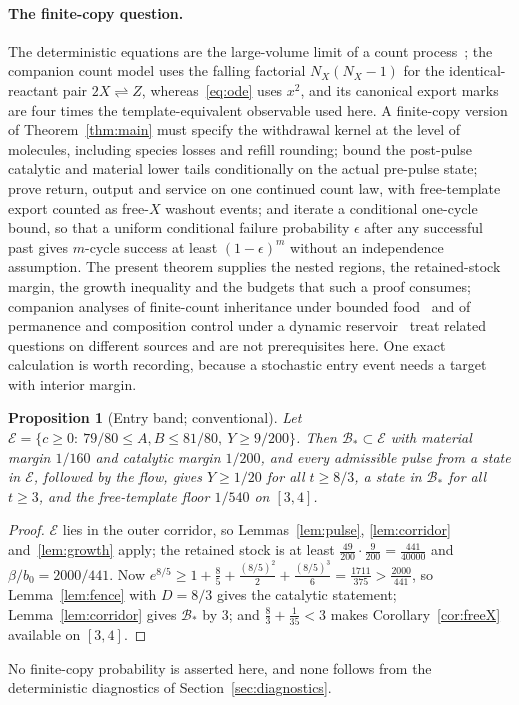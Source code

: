 \documentclass[11pt,a4paper]{article}
\theoremstyle{plain}
\newtheorem{proposition}[theorem]{Proposition}
\theoremstyle{definition}
\theoremstyle{remark}
\newcommand{\Bstar}{\mathcal B_*}
\newcommand{\Ent}{\mathcal E}
\begin{document}
\paragraph{The finite-copy question.}
The deterministic equations are the large-volume limit of a count process~\citep{kurtz1972,anderson2015}; the companion count model uses the falling factorial $N_X(N_X-1)$ for the identical-reactant pair $2X\rightleftharpoons Z$, whereas~\eqref{eq:ode} uses $x^2$, and its canonical export marks are four times the template-equivalent observable used here. A finite-copy version of Theorem~\ref{thm:main} must specify the withdrawal kernel at the level of molecules, including species losses and refill rounding; bound the post-pulse catalytic and material lower tails conditionally on the actual pre-pulse state; prove return, output and service on one continued count law, with free-template export counted as free-$X$ washout events; and iterate a conditional one-cycle bound, so that a uniform conditional failure probability $\epsilon$ after any successful past gives $m$-cycle success at least $(1-\epsilon)^m$ without an independence assumption. The present theorem supplies the nested regions, the retained-stock margin, the growth inequality and the budgets that such a proof consumes; companion analyses of finite-count inheritance under bounded food~\citep{inheritance2026} and of permanence and composition control under a dynamic reservoir~\citep{permanence2026} treat related questions on different sources and are not prerequisites here. One exact calculation is worth recording, because a stochastic entry event needs a target with interior margin.

\begin{proposition}[Entry band; conventional]\label{prop:entry}
Let $\Ent=\{c\ge0:\ 79/80\le A,B\le81/80,\ Y\ge9/200\}$. Then $\Bstar\subset\Ent$ with material margin $1/160$ and catalytic margin $1/200$, and every admissible pulse from a state in $\Ent$, followed by the flow, gives $Y\ge1/20$ for all $t\ge8/3$, a state in $\Bstar$ for all $t\ge3$, and the free-template floor $1/540$ on $[3,4]$.
\end{proposition}
\begin{proof}
$\Ent$ lies in the outer corridor, so Lemmas~\ref{lem:pulse}, \ref{lem:corridor} and~\ref{lem:growth} apply; the retained stock is at least $\tfrac{49}{200}\cdot\tfrac9{200}=\tfrac{441}{40000}$ and $\beta/b_0=2000/441$. Now $e^{8/5}\ge1+\tfrac85+\tfrac{(8/5)^2}2+\tfrac{(8/5)^3}6=\tfrac{1711}{375}>\tfrac{2000}{441}$, so Lemma~\ref{lem:fence} with $D=8/3$ gives the catalytic statement; Lemma~\ref{lem:corridor} gives $\Bstar$ by $3$; and $\tfrac83+\tfrac1{35}<3$ makes Corollary~\ref{cor:freeX} available on $[3,4]$.
\end{proof}
No finite-copy probability is asserted here, and none follows from the deterministic diagnostics of Section~\ref{sec:diagnostics}.
\end{document}
